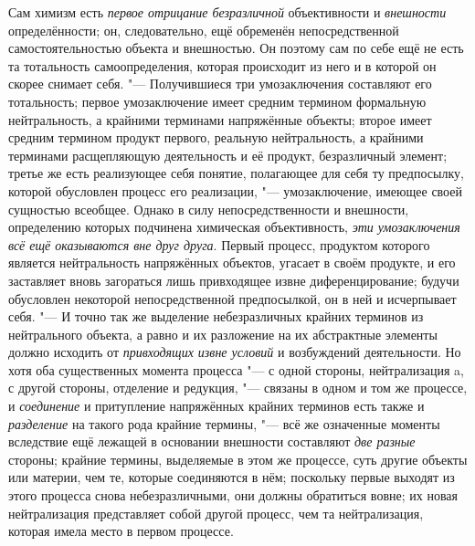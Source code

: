 Сам химизм есть {\em первое
отрицание безразличной} объективности и
{\em внешности}
определённости; он, следовательно, ещё обременён
непосредственной самостоятельностью объекта и внешностью. Он поэтому сам по
себе ещё не есть та тотальность самоопределения, которая происходит из него
и в которой он скорее снимает себя. "--- Получившиеся три
умозаключения составляют его тотальность; первое умозаключение имеет
средним термином формальную нейтральность, а крайними терминами напряжённые
объекты; второе имеет средним термином продукт первого, реальную
нейтральность, а крайними терминами расщепляющую деятельность и её продукт,
безразличный элемент; третье же есть реализующее себя понятие, полагающее
для себя ту предпосылку, которой обусловлен процесс его реализации, "---
умозаключение, имеющее своей сущностью всеобщее. Однако в
силу непосредственности и внешности, определению которых подчинена
химическая объективность, {\em эти
умозаключения всё ещё оказываются вне друг друга}. Первый
процесс, продуктом которого является нейтральность напряжённых объектов,
угасает в своём продукте, и его заставляет вновь загораться лишь
привходящее извне диференцирование; будучи обусловлен некоторой
непосредственной предпосылкой, он в ней и исчерпывает себя. "---
И точно так же выделение небезразличных крайних терминов из
нейтрального объекта, а равно и их разложение на их абстрактные элементы
должно исходить от {\em привходящих
извне условий} и возбуждений деятельности. Но хотя оба
существенных момента процесса "--- с одной стороны,
нейтрализация a, с другой стороны, отделение и редукция, "---
связаны в одном и том же процессе, и
{\em соединение} и
притупление напряжённых крайних терминов есть также и
{\em разделение} на
такого рода крайние термины, "--- всё же означенные моменты
вследствие ещё лежащей в основании внешности составляют
{\em две разные} стороны;
крайние термины, выделяемые в этом же процессе, суть другие объекты или
материи, чем те, которые соединяются в нём; поскольку первые выходят из
этого процесса снова небезразличными, они должны обратиться
вовне; их новая нейтрализация представляет собой другой процесс, чем та
нейтрализация, которая имела место в первом процессе.

